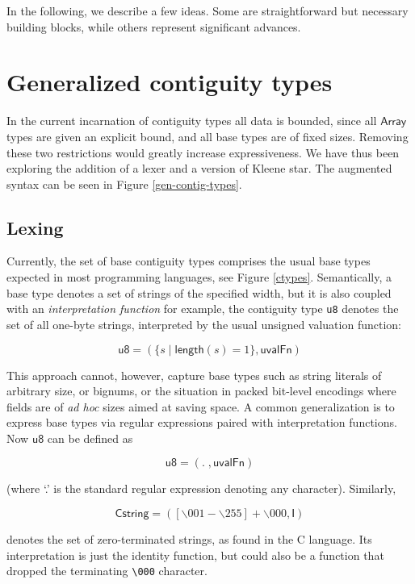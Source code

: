 \documentclass{article}
\newcommand{\konst}[1]{\ensuremath{\mathsf{#1}}}
\newcommand{\set}[1]{\ensuremath{\{ {#1} \}}}
\theoremstyle{definition}
\begin{document}
In the following, we describe a few ideas. Some are straightforward
but necessary building blocks, while others represent significant
advances.

\section{Generalized contiguity types}

In the current incarnation of contiguity types all data is bounded,
since all \konst{Array} types are given an explicit bound, and all
base types are of fixed sizes. Removing these two restrictions would
greatly increase expressiveness. We have thus been exploring the
addition of a lexer and a version of Kleene star. The augmented syntax
can be seen in Figure \ref{gen-contig-types}.

\subsection{Lexing}

Currently, the set of base contiguity types comprises the usual base
types expected in most programming languages, see Figure
\ref{ctypes}. Semantically, a base type denotes a set of strings of
the specified width, but it is also coupled with an
\emph{interpretation function} for example, the contiguity type
\verb+u8+ denotes the set of all one-byte strings, interpreted by the
usual unsigned valuation function:

  \[ \konst{u8} = (\set{s \mid \konst{length}(s) = 1}, \konst{uvalFn} )
  \]

  This approach cannot, however, capture base types such as string
  literals of arbitrary size, or bignums, or the situation in packed
  bit-level encodings where fields are of \emph{ad hoc} sizes aimed at
  saving space. A common generalization is to express base types via
  regular expressions paired with interpretation functions. Now
  \konst{u8} can be defined as

  \[ \konst{u8} = ( . \; , \konst{uvalFn})
  \]

\noindent (where `.' is the standard regular expression denoting any character). Similarly,

  \[ \konst{Cstring} = ([\backslash 001-\backslash 255]+ \backslash 000, \konst{I} )
  \]

\noindent denotes the set of zero-terminated strings, as found in the
C language. Its interpretation is just the identity function, but
could also be a function that dropped the terminating \verb+\000+
character.
\end{document}
